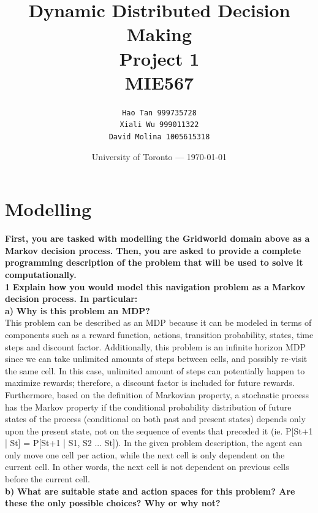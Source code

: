 \documentclass[11pt]{article}
\title{Dynamic Distributed Decision Making \\Project 1 \\MIE567} %
\author{\texttt{Hao Tan 999735728}\\ \texttt{Xiali Wu 999011322} \\ \texttt{David Molina 1005615318}} %
\date{University of Toronto --- \today} %
\begin{document}
\maketitle

\section{Modelling}
\textbf{First, you are tasked with modelling the Gridworld domain
above as a Markov decision process. Then, you are asked to provide a complete
programming description of the problem that will be used to solve it
computationally.}
\\

\noindent
\textbf{1}
\noindent
\textbf{Explain how you would model this navigation problem as a Markov
decision process. In particular:}
\\

\noindent
\textbf{a)}
\noindent
\textbf{Why is this problem an MDP? }
\\

\noindent
This problem can be described as an MDP because it can be modeled in terms of
components such as a reward function, actions, transition probability, states,
time steps and discount factor. Additionally, this problem is an infinite
horizon MDP since we can take unlimited amounts of steps between cells, and
possibly re-visit the same cell. In this case, unlimited amount of steps can
potentially happen to maximize rewards; therefore, a discount factor is included
for future rewards.
\\

\noindent
Furthermore, based on the definition of Markovian property, a stochastic process
has the Markov property if the conditional probability distribution of future
states of the process (conditional on both past and present states) depends only
upon the present state, not on the sequence of events that preceded it (ie.
P[St+1 | St] = P[St+1 | S1, S2 ... St]). In the given problem description, the
agent can only move one cell per action, while the next cell is only dependent
on the current cell. In other words, the next cell is not dependent on previous
cells before the current cell.
\\

\noindent
\textbf{b)}
\noindent
\textbf{What are suitable state and action spaces for this problem? Are
these the only possible choices? Why or why not?}
\\
\end{document}
